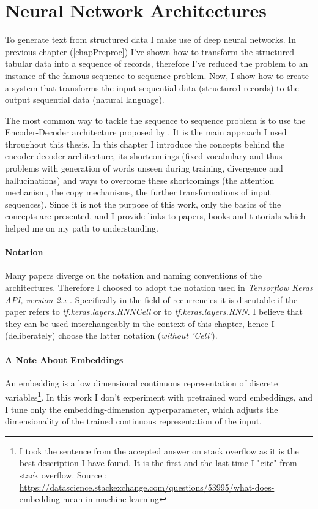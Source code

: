 \chapter{Neural Network Architectures} \label{neural_nets_chapter}
To generate text from structured data I make use of deep neural networks. In previous chapter (\ref{chapPreproc}) I've shown how to transform the structured tabular data into a sequence of records, therefore I've reduced the problem to an instance of the famous sequence to sequence problem. Now, I show how to create a system that transforms the input sequential data (structured records) to the output sequential data (natural language).

The most common way to tackle the sequence to sequence problem is to use the Encoder-Decoder architecture proposed by \citep{sutskever2014sequence}. It is the main approach I used throughout this thesis. In this chapter I introduce the concepts behind the encoder-decoder architecture, its shortcomings (fixed vocabulary and thus problems with generation of words unseen during training, divergence and hallucinations) and ways to overcome these shortcomings (the attention mechanism, the copy mechanisms, the further transformations of input sequences). Since it is not the purpose of this work, only the basics of the concepts are presented, and I provide links to papers, books and tutorials which helped me on my path to understanding.

\subsubsection{Notation}
Many papers diverge on the notation and naming conventions of the architectures. Therefore I choosed to adopt the notation used in \emph{Tensorflow Keras API, version 2.x} \citep{tensorflow2015-whitepaper}. Specifically in the field of recurrencies it is discutable if the paper refers to \emph{tf.keras.layers.RNNCell} or to \emph{tf.keras.layers.RNN}. I believe that they can be used interchangeably in the context of this chapter, hence I (deliberately) choose the latter notation (\emph{without 'Cell'}).

\subsubsection{A Note About Embeddings}

An embedding is a low dimensional continuous representation of discrete variables\footnote{I took the sentence from the accepted answer on stack overflow as it is the best description I have found. It is the first and the last time I "cite" from stack overflow. Source : \url{https://datascience.stackexchange.com/questions/53995/what-does-embedding-mean-in-machine-learning}}. In this work I don't experiment with pretrained word embeddings, and I tune only the embedding-dimension hyperparameter, which adjusts the dimensionality of the trained continuous representation of the input.

